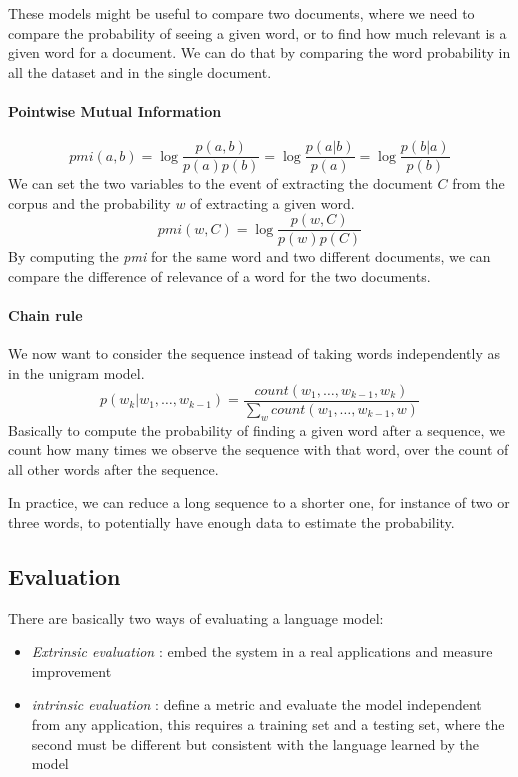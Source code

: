 These models might be useful to compare two documents, where we 
need to compare the probability of seeing a given word, 
or to find how much relevant is a given word for a document. 
We can do that by comparing the word probability in all the dataset and in the
single document.

\paragraph{Pointwise Mutual Information}
$$\mathit{pmi}(a,b) = \log\frac{p(a,b)}{p(a)p(b)} = \log \frac{p(a | b)}{p(a)} = \log\frac{p(b|a)}{p(b)}$$
We can set the two variables to the event of extracting the document $C$ from 
the corpus and the probability $w$ of extracting a given word. 
$$\mathit{pmi}(w, C) = \log\frac{p(w, C)}{p(w)p(C)}$$
By computing the \emph{pmi} for the same word and two different documents, 
we can compare the difference of relevance of a word for the two 
documents.

\paragraph{Chain rule}
We now want to consider the sequence instead of taking words independently 
as in the unigram model.
$$p(w_k | w_1, \dots, w_{k-1}) = 
\frac{\mathit{count}(w_1, \dots, w_{k-1}, w_k)}{\sum_w \mathit{count}(w_1, \dots, w_{k-1}, w)}$$ 
Basically to compute the probability of finding a given word 
after a sequence, we count how many times we observe the sequence with
that word, over the count of all other words after the sequence.

In practice, we can reduce a long sequence to a shorter one, for instance
of two or three words, to potentially have enough data to estimate the probability.

\subsection{Evaluation}

There are basically two ways of evaluating a language model:
\begin{itemize}
    \item \emph{Extrinsic evaluation} : embed the system in a real applications
    and measure improvement
    \item \emph{intrinsic evaluation} : define a metric and evaluate the 
    model independent from any application, this requires a training set and 
    a testing set, where the second must be different but consistent 
    with the language learned by the model
\end{itemize}


